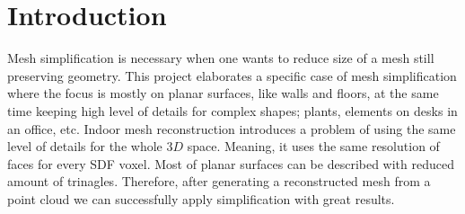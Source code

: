 \chapter{Introduction}
\setcounter{page}{1}%
\thispagestyle{empty}

Mesh simplification is necessary when one wants to reduce size of a mesh still preserving geometry. This project elaborates a specific case of mesh simplification where the focus is mostly on planar surfaces, like walls and floors, at the same time keeping high level of details for complex shapes; plants, elements on desks in an office, etc. Indoor mesh reconstruction introduces a problem of using the same level of details for the whole $3D$ space. Meaning, it uses the same resolution of faces for every SDF voxel. Most of planar surfaces can be described with reduced amount of trinagles. Therefore, after generating a reconstructed mesh from a point cloud we can successfully apply simplification with great results.